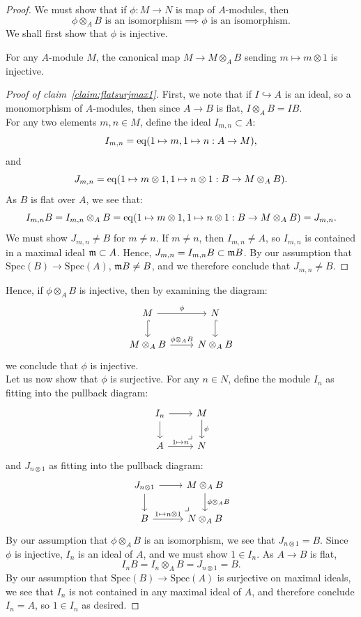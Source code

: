 \begin{proof}
We must show that if $\phi: M \to N$ is map of $A$-modules, then 
\[\phi \otimes_A B \text{ is an isomorphism} \implies \phi \text{ is an isomorphism}.\]
We shall first show that $\phi$ is injective.
\begin{claim}\label{claim:flatsurjmax1}
For any $A$-module $M$, the canonical map $M \to M \otimes_A B$ sending $m \mapsto m\otimes 1$ is injective.
\end{claim}
\begin{proof}[Proof of claim~\ref{claim:flatsurjmax1}]
First, we note that if $I \hookrightarrow A$ is an ideal, so a monomorphism of $A$-modules, 
then since $A \to B$ is flat, $I \otimes_A B = IB$.\\
\indent For any two elements $m,n \in M$, define the ideal $I_{m,n} \subset A$:
\[I_{m,n} = \operatorname{eq}(1 \mapsto m, 1 \mapsto n: A \rightarrow M),\]
and 
\[J_{m,n}=\operatorname{eq}(1 \mapsto m \otimes 1, 1 \mapsto n\otimes 1: B \rightarrow M \otimes_A B).\]
As $B$ is flat over $A$, we see that:
\[I_{m,n}B = I_{m,n} \otimes_A B = \operatorname{eq}(1 \mapsto m \otimes 1, 1 \mapsto n\otimes 1: B \rightarrow M\otimes_A B) = J_{m,n}.\]
We must show $J_{m,n} \neq B$ for $m \neq n$. If $m \neq n$, then $I_{m,n} \neq A$, so $I_{m,n}$ is contained in a maximal ideal $\mathfrak{m} \subset A$. Hence, 
$J_{m,n} = I_{m,n}B \subset \mathfrak{m}B$. By our assumption that $\text{Spec}(B) \to \text{Spec}(A)$, $\mathfrak{m}B \neq B$, and we therefore conclude
 that $J_{m,n} \neq B$.
\end{proof}
Hence, if $\phi\otimes_A B$ is injective, then by examining the diagram:
\[\begin{tikzcd} M \arrow[r, "\phi"] \arrow[hookrightarrow,d] & N\arrow[hookrightarrow,d]\\
    M \otimes_A B \arrow[r, "\phi \otimes_A B"] & N\otimes_A B 
\end{tikzcd}\]
we conclude that $\phi$ is injective.\\
\indent Let us now show that $\phi$ is surjective. For any $n \in N$, define the module $I_{n}$ as fitting into the pullback diagram:
\[
\begin{tikzcd}
I_n \arrow[r] \arrow[d]
  & M \arrow[d, "\phi"] \\
A \arrow[r, "1 \mapsto n"]
  & N
  \arrow[ul, phantom, "\lrcorner", very near start]
\end{tikzcd}
\]
and $J_{n\otimes 1}$ as fitting into the pullback diagram:
\[
\begin{tikzcd}
J_{n \otimes 1} \arrow[r] \arrow[d]
  & M\otimes_A B \arrow[d, "\phi \otimes_A B"] \\
B \arrow[r, "1 \mapsto n \otimes 1"]
  & N \otimes_A B
  \arrow[ul, phantom, "\lrcorner", very near start]
\end{tikzcd}
\]
By our assumption that $\phi \otimes_A B$ is an isomorphism, we see that $J_{n \otimes 1} = B$. Since $\phi$ is injective, 
$I_{n}$ is an ideal of $A$, and we must show $1 \in I_{n}$. As $A \to B$ is flat, 
\[I_nB = I_n \otimes_A B = J_{n\otimes1} = B.\]
By our assumption that $\text{Spec}(B) \to \text{Spec}(A)$ is surjective on maximal ideals, we see that $I_n$ is not contained in any maximal ideal of $A$, 
and therefore conclude $I_n = A$, so $1 \in I_n$ as desired.
\end{proof}
